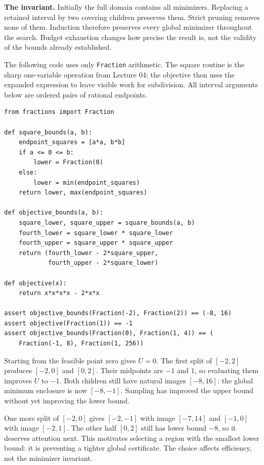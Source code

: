 \textbf{The invariant.} Initially the full domain contains all minimizers.
Replacing a retained interval by two covering children preserves them.
Strict pruning removes none of them. Induction therefore preserves every
global minimizer throughout the search. Budget exhaustion changes how
precise the result is, not the validity of the bounds already established.

\newpage
{}
The following code uses only \texttt{Fraction} arithmetic. The square
routine is the sharp one-variable operation from Lecture 04; the objective
then uses the expanded expression to leave visible work for subdivision.
All interval arguments below are ordered pairs of rational endpoints.
\begin{lstlisting}
from fractions import Fraction

def square_bounds(a, b):
    endpoint_squares = [a*a, b*b]
    if a <= 0 <= b:
        lower = Fraction(0)
    else:
        lower = min(endpoint_squares)
    return lower, max(endpoint_squares)

def objective_bounds(a, b):
    square_lower, square_upper = square_bounds(a, b)
    fourth_lower = square_lower * square_lower
    fourth_upper = square_upper * square_upper
    return (fourth_lower - 2*square_upper,
            fourth_upper - 2*square_lower)

def objective(x):
    return x*x*x*x - 2*x*x

assert objective_bounds(Fraction(-2), Fraction(2)) == (-8, 16)
assert objective(Fraction(1)) == -1
assert objective_bounds(Fraction(0), Fraction(1, 4)) == (
    Fraction(-1, 8), Fraction(1, 256))
\end{lstlisting}

Starting from the feasible point zero gives $U=0$. The first split of
$[-2,2]$ produces $[-2,0]$ and $[0,2]$. Their midpoints are $-1$ and $1$,
so evaluating them improves $U$ to $-1$. Both children still have natural
images $[-8,16]$: the global minimum enclosure is now $[-8,-1]$.
Sampling has improved the upper bound without yet improving the lower bound.

One more split of $[-2,0]$ gives $[-2,-1]$ with image $[-7,14]$ and
$[-1,0]$ with image $[-2,1]$. The other half $[0,2]$ still has lower
bound $-8$, so it deserves attention next. This motivates selecting a
region with the smallest lower bound: it is preventing a tighter global
certificate. The choice affects efficiency, not the minimizer invariant.

